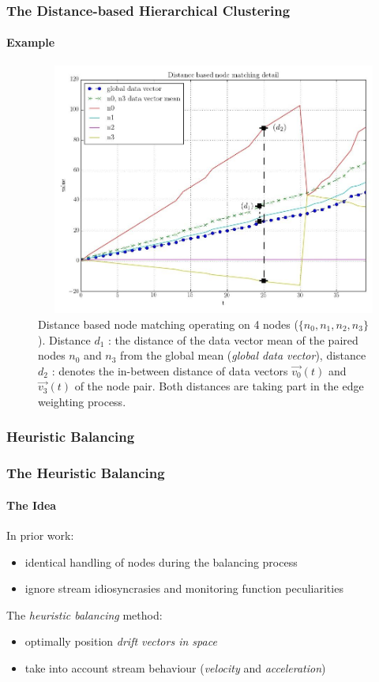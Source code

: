 \documentclass[hyperref={pdfpagelabels=false}]{beamer}
\begin{document}
\begin{frame} \frametitle{The Distance-based Hierarchical Clustering}\framesubtitle{Example}
\begin{figure}
\begin{columns}
\begin{column}[t]{0.4\linewidth}
\vspace{-5.5cm}\caption{Distance based node matching operating on 4 nodes ($\{n_0, n_1, n_2, n_3\}$). Distance $d_1$ : the distance of the data vector mean of the paired nodes $n_0$ and $n_3$ from the global mean (\emph{global data vector}), distance $d_2$ : denotes the in-between distance of data vectors $\vec{v_0}(t)$ and $\vec{v_3}(t)$ of the node pair. Both distances are taking part in the edge weighting process.} \label{fig:distoptpairdetailed}
\end{column}
\begin{column}[t]{0.6\linewidth}
\centering
\includegraphics[scale=0.22]{../img/distoptpair_example_detail_edited.jpeg}
\end{column}
\end{columns}
\end{figure}
\end{frame}

\subsubsection*{Heuristic Balancing}
\begin{frame} \frametitle{The Heuristic Balancing}\framesubtitle{The Idea}
In prior work:
\begin{itemize}
\item identical handling of nodes during the balancing process
\item ignore stream idiosyncrasies and monitoring function peculiarities
\end{itemize}
The \emph{heuristic balancing} method:
\begin{itemize}
\item optimally position \emph{drift vectors in space}
\item take into account stream behaviour (\emph{velocity} and \emph{acceleration})
\end{itemize}
\end{frame}
\end{document}
